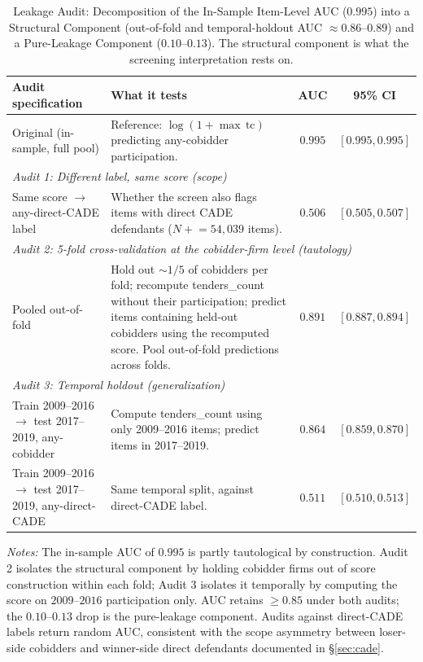 \begin{table}[htbp]
\centering
\caption[Leakage audit: AUC decomposition]{Leakage Audit:
Decomposition of the In-Sample Item-Level AUC ($0.995$) into
a Structural Component (out-of-fold and temporal-holdout AUC
$\approx 0.86$--$0.89$) and a Pure-Leakage Component
($0.10$--$0.13$). The structural component is what the
screening interpretation rests on.}
\label{tab:leakage_audit}
\begin{threeparttable}
\small
\begin{tabular}{p{4.5cm}p{5cm}cc}
\toprule
Audit specification & What it tests & AUC & 95\% CI \\
\midrule
Original (in-sample, full pool) & Reference: $\log(1+\max\,\text{tc})$ predicting any-cobidder participation. & $0.995$ & $[0.995, 0.995]$ \\
\midrule
\multicolumn{4}{l}{\emph{Audit 1: Different label, same score (scope)}} \\
Same score $\to$ any-direct-CADE label & Whether the screen also flags items with direct CADE defendants ($N\!\!+\!\!=\!\!54{,}039$ items). & $0.506$ & $[0.505, 0.507]$ \\
\midrule
\multicolumn{4}{l}{\emph{Audit 2: 5-fold cross-validation at the cobidder-firm level (tautology)}} \\
Pooled out-of-fold & Hold out $\sim\!\!1/5$ of cobidders per fold; recompute tenders\_count without their participation; predict items containing held-out cobidders using the recomputed score. Pool out-of-fold predictions across folds. & $0.891$ & $[0.887, 0.894]$ \\
\midrule
\multicolumn{4}{l}{\emph{Audit 3: Temporal holdout (generalization)}} \\
Train 2009--2016 $\to$ test 2017--2019, any-cobidder & Compute tenders\_count using only 2009--2016 items; predict items in 2017--2019. & $0.864$ & $[0.859, 0.870]$ \\
Train 2009--2016 $\to$ test 2017--2019, any-direct-CADE & Same temporal split, against direct-CADE label. & $0.511$ & $[0.510, 0.513]$ \\
\bottomrule
\end{tabular}
\begin{tablenotes}
\small
\item \textit{Notes:} The in-sample AUC of $0.995$ is partly
tautological by construction. Audit 2 isolates the structural
component by holding cobidder firms out of score construction
within each fold; Audit 3 isolates it temporally by computing
the score on $2009$--$2016$ participation only. AUC retains
$\geq\!0.85$ under both audits; the $0.10$--$0.13$ drop is the
pure-leakage component. Audits against direct-CADE labels return
random AUC, consistent with the scope asymmetry between
loser-side cobidders and winner-side direct defendants
documented in \S\ref{sec:cade}.
\end{tablenotes}
\end{threeparttable}
\end{table}
